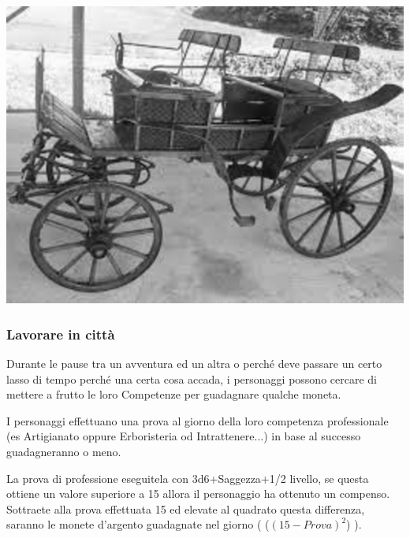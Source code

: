 \begin{multicols}{2}
%



\begin{center}
\includegraphics[width=0.8\linewidth]{immagini/carrozza.png}
\end{center}


\subsubsection{Lavorare in città}

Durante le pause tra un avventura ed un altra o perché deve passare un certo lasso di tempo perché una certa cosa accada, i personaggi possono cercare di mettere a frutto le loro Competenze per guadagnare qualche moneta.

I personaggi effettuano una prova al giorno della loro competenza professionale (es Artigianato oppure Erboristeria od Intrattenere...) in base al successo guadagneranno o meno.

La prova di professione eseguitela con 3d6+Saggezza+1/2 livello, se questa ottiene un valore superiore a 15 allora il personaggio ha ottenuto un compenso. Sottraete alla prova effettuata 15 ed elevate al quadrato questa differenza, saranno le monete d'argento guadagnate nel giorno ( ($(15-Prova)^2$) ).

\end{multicols}

